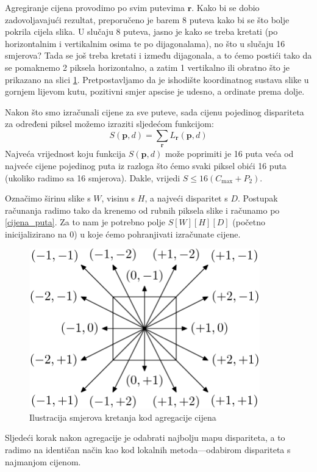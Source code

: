\documentclass[utf8, zavrsni, numeric]{fer}
\begin{document}
Agregiranje cijena provodimo po svim putevima $\mathbf{r}$. Kako bi se dobio zadovoljavajući rezultat,
preporučeno je barem 8 puteva kako bi se što bolje pokrila cijela slika. U slučaju 8 puteva, jasno je kako se treba kretati (po horizontalnim i vertikalnim osima te po dijagonalama), no što u slučaju 16 smjerova?
Tada se još treba kretati i između dijagonala, a to ćemo postići tako da se pomaknemo 2 piksela horizontalno, a zatim 1 vertikalno ili obratno što je prikazano na slici \ref{fig:SGM-paths}. Pretpostavljamo da je ishodište koordinatnog sustava slike u gornjem lijevom kutu, pozitivni smjer apscise je udesno, a ordinate prema dolje.

Nakon što smo izračunali cijene za sve puteve, sada cijenu pojedinog dispariteta za određeni
piksel možemo izraziti sljedećom funkcijom:
\begin{equation}
  S(\mathbf{p}, d) = \sum_{\mathbf{r}}L_{\mathbf{r}}(\mathbf{p}, d)
\end{equation}
Najveća vrijednost koju funkcija $S(\mathbf{p}, d)$ može poprimiti je 16 puta veća od najveće cijene pojedinog puta iz razloga što
ćemo svaki piksel obići 16 puta (ukoliko radimo sa 16 smjerova). Dakle, vrijedi $S \leq 16(C_{\max} + P_2)$.

Označimo širinu slike s $W$, visinu s $H$, a najveći disparitet s $D$.
Postupak računanja radimo tako da krenemo od rubnih piksela slike i računamo po \ref{cijena_puta}. Za to nam je potrebno polje $S[W][H][D]$ (početno inicijalizirano na 0) u koje ćemo pohranjivati izračunate cijene.


\begin{figure}[H]
  \centering
  \includegraphics[width=10cm]{img/sgm_smjerovi.png}
  \caption{Ilustracija smjerova kretanja kod agregacije cijena}
  \label{fig:SGM-paths}
\end{figure}

Sljedeći korak nakon agregacije je odabrati najbolju mapu dispariteta, a to radimo na identičan način
kao kod lokalnih metoda---odabirom dispariteta s najmanjom cijenom.
\end{document}
